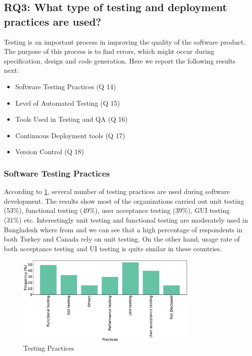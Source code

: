 \subsection{RQ3: What type of testing and deployment practices are used?}
\label{RQ3}
Testing is an important process in improving the quality of the software product. The purpose of this process is to find errors, which might occur during specification, design and code generation. Here we report the following results next:
\begin{itemize}
\item Software Testing Practices (Q 14)
\item Level of Automated Testing (Q 15)
\item Tools Used in Testing and QA (Q 16)
\item Continuous Deployment tools (Q 17)
\item Version Control (Q 18)
\end{itemize}

\subsubsection{Software Testing Practices}
According to \ref{fig:testing}, several number of testing practices are used during software development. The results show most of the organizations carried out unit testing (53\%), functional testing (49\%), user acceptance testing (39\%), GUI testing (31\%) etc. Interestingly unit testing and functional testing are moderately used in Bangladesh where from \cite{Wang2018} and \cite{Garousi2013} we can see that a high percentage of respondents in both Turkey and Canada rely on unit testing. On the other hand, usage rate of both acceptance testing and UI testing is quite similar in these countries.
\begin{figure}[htbp]
\centering
  \includegraphics[width=0.8\textwidth]{Figures/Respondents_testing_practices}
  \caption{Testing Practices}
  \label{fig:testing}
\end{figure}

